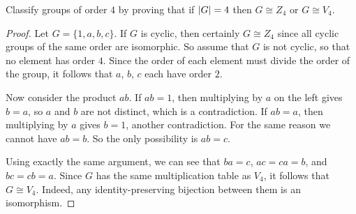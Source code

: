  Classify groups of order $4$ by proving that if
$\lvert{G}\rvert = 4$ then $G\cong Z_4$ or $G\cong V_4$.
\begin{proof}
  Let $G = \{1,a,b,c\}$. If $G$ is cyclic, then certainly $G\cong Z_4$
  since all cyclic groups of the same order are isomorphic. So assume
  that $G$ is not cyclic, so that no element has order $4$. Since the
  order of each element must divide the order of the group, it follows
  that $a$, $b$, $c$ each have order $2$.

  Now consider the product $ab$. If $ab = 1$, then multiplying by $a$
  on the left gives $b = a$, so $a$ and $b$ are not distinct, which is
  a contradiction. If $ab = a$, then multiplying by $a$ gives $b = 1$,
  another contradiction. For the same reason we cannot have $ab =
  b$. So the only possibility is $ab = c$.

  Using exactly the same argument, we can see that $ba = c$,
  $ac = ca = b$, and $bc = cb = a$. Since $G$ has the same
  multiplication table as $V_4$, it follows that $G\cong V_4$. Indeed,
  any identity-preserving bijection between them is an isomorphism.
\end{proof}

